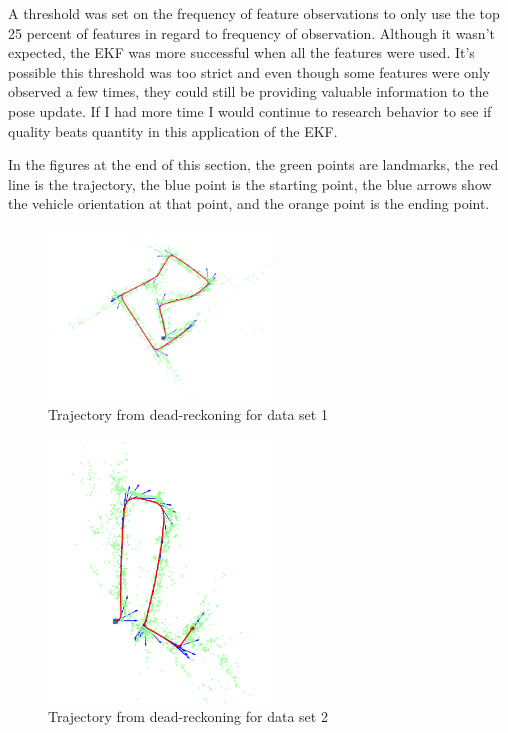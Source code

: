 \documentclass[conference]{IEEEtran}
\begin{document}
A threshold was set on the frequency of feature observations to only use the top 25 percent of features in regard to frequency of observation. Although it wasn't expected, the EKF was more successful when all the features were used. It's possible this threshold was too strict and even though some features were only observed a few times, they could still be providing valuable information to the pose update. If I had more time I would continue to research behavior to see if quality beats quantity in this application of the EKF.

In the figures at the end of this section, the green points are landmarks, the red line is the trajectory, the blue point is the starting point, the blue arrows show the vehicle orientation at that point, and the orange point is the ending point.

\begin{figure}[H]
\centerline{\includegraphics[width=60mm]{mapping_27.png}}
\caption{Trajectory from dead-reckoning for data set 1}
\end{figure} 
\begin{figure}[H]
\centerline{\includegraphics[width=60mm]{mapping_22.png}}
\caption{Trajectory from dead-reckoning for data set 2}
\end{figure} 
\end{document}

